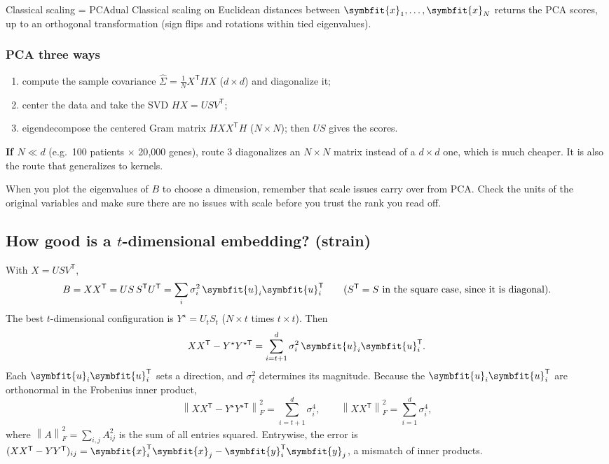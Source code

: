 \documentclass[11pt]{article}
\newcommand{\bm}[1]{\symbfit{#1}}
\newcommand{\vx}{\bm{x}}
\newcommand{\vy}{\bm{y}}
\newcommand{\vu}{\bm{u}}
\newcommand{\Sig}{\widehat{\Sigma}}
\newcommand{\T}{^{\mathsf T}}
\newcommand{\Fro}[1]{\left\lVert #1\right\rVert_F}
\begin{document}
\begin{theorem}{Classical scaling = PCA}{dual}
Classical scaling on Euclidean distances between $\vx_1,\dots,\vx_N$ returns the PCA scores,
up to an orthogonal transformation (sign flips and rotations within tied eigenvalues).
\end{theorem}

\subsubsection*{PCA three ways}\label{sec:threeways}
\begin{enumerate}[nosep,label=\arabic*)]
\item compute the sample covariance $\Sig=\tfrac1N X\T HX$ ($d\times d$) and diagonalize it;
\item center the data and take the SVD $HX=USV\T$;
\item eigendecompose the centered Gram matrix $HXX\T H$ ($N\times N$); then $US$ gives the scores.
\end{enumerate}
\textbf{If $N\ll d$} (e.g.\ 100 patients $\times$ 20{,}000 genes), route 3 diagonalizes an
$N\times N$ matrix instead of a $d\times d$ one, which is much cheaper. It is also the route
that generalizes to kernels.

\begin{careful}
When you plot the eigenvalues of $B$ to choose a dimension, remember that scale issues
carry over from PCA. Check the units of the original variables and make sure there are no
issues with scale before you trust the rank you read off.
\end{careful}

\subsection{How good is a $t$-dimensional embedding? (strain)}

With $X=USV\T$,
\[
B=XX\T=US\,S\T U\T=\sum_{i}\sigma_i^2\,\vu_i\vu_i\T \qquad (S\T=S \text{ in the square case, since it is diagonal}).
\]
The best $t$-dimensional configuration is $Y^\star=U_tS_t$ ($N\times t$ times $t\times t$). Then
\[
XX\T-Y^\star Y^{\star\mathsf T}=\sum_{i=t+1}^{d}\sigma_i^2\,\vu_i\vu_i\T .
\]
Each $\vu_i\vu_i\T$ sets a direction, and $\sigma_i^2$ determines its magnitude. Because the
$\vu_i\vu_i\T$ are orthonormal in the Frobenius inner product,
\[
\Fro{XX\T-Y^\star Y^{\star\mathsf T}}^2=\sum_{i=t+1}^d\sigma_i^4,
\qquad
\Fro{XX\T}^2=\sum_{i=1}^d\sigma_i^4,
\]
where $\Fro{A}^2=\sum_{i,j}A_{ij}^2$ is the sum of all entries squared. Entrywise, the error
is $(XX\T-YY\T)_{ij}=\vx_i\T\vx_j-\vy_i\T\vy_j$, a mismatch of inner products.
\end{document}
